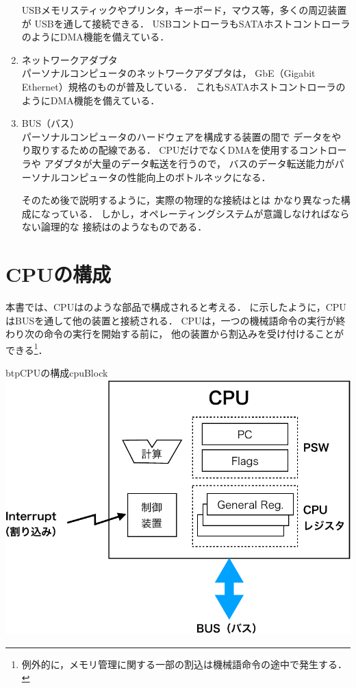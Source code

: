 \begin{enumerate}
  USBメモリスティックやプリンタ，キーボード，マウス等，多くの周辺装置が
  USBを通して接続できる．
  USBコントローラもSATAホストコントローラのようにDMA機能を備えている．
\item ネットワークアダプタ \\
  パーソナルコンピュータのネットワークアダプタは，
  GbE（Gigabit Ethernet）規格のものが普及している．
  これもSATAホストコントローラのようにDMA機能を備えている．
\item BUS（バス） \\
  パーソナルコンピュータのハードウェアを構成する装置の間で
  データをやり取りするための配線である．
  CPUだけでなくDMAを使用するコントローラや
  アダプタが大量のデータ転送を行うので，
  バスのデータ転送能力がパーソナルコンピュータの性能向上のボトルネックになる．

  そのため後で説明するように，実際の物理的な接続はとは
  かなり異なった構成になっている．
  しかし，オペレーティングシステムが意識しなければならない論理的な
  接続はのようなものである．
\end{enumerate}

\section{CPUの構成}
本書では、CPUはのような部品で構成されると考える．
に示したように，CPUはBUSを通して他の装置と接続される．
CPUは，一つの機械語命令の実行が終わり次の命令の実行を開始する前に，
他の装置から割込みを受け付けることができる\footnote{
  例外的に，メモリ管理に関する一部の割込は機械語命令の途中で発生する．}．

\begin{myfig}{btp}{CPUの構成}{cpuBlock}
  \includegraphics[scale=0.66]{Fig/cpuBlock-crop.pdf}
\end{myfig}

